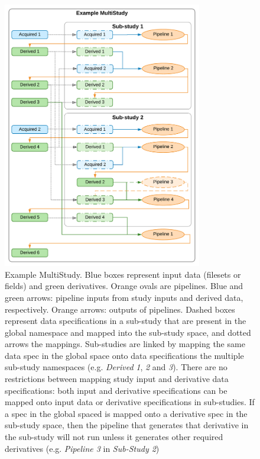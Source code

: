 \documentclass[smallextended]{svjour3}       %
\begin{document}
\begin{figure}
  \centering
    \includegraphics[width=0.775\textwidth]{../figures/example_multi_study}
  \caption{Example MultiStudy. Blue boxes represent input data
(filesets or fields) and green derivatives. Orange ovals
are pipelines. Blue and green arrows: pipeline inputs from study inputs
and derived data, respectively. Orange arrows: outputs of pipelines. Dashed
boxes represent data specifications in a sub-study that are present in
the global namespace and mapped into the sub-study space, and dotted
arrows the mappings. Sub-studies are linked by mapping the same data
spec in the global space onto data specifications the multiple sub-study
namespaces (e.g. \emph{Derived} \emph{1}, \emph{2} and \emph{3}).
There are no restrictions between mapping study input and derivative data
specifications: both input and derivative specifications can be mapped
onto input data or derivative specifications in sub-studies.
If a spec in the global spaced is mapped onto a derivative spec in the
sub-study space, then the pipeline that generates that derivative in the
sub-study will not run unless it generates other required derivatives
(e.g. \emph{Pipeline 3} in \emph{Sub-Study 2})}
\label{fig:example_multi_study}
\end{figure}
\end{document}
